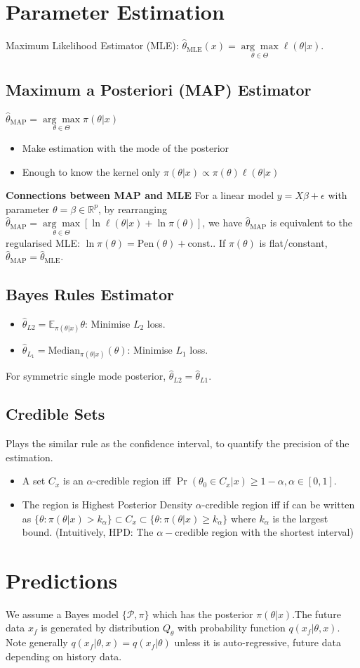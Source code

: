 \documentclass[5pt,a4paper, twocolumn]{article}
\newcommand{\topic}[1]{\section*{#1}}
\newcommand{\subtopic}[1]{\subsection*{#1}}
\newcommand{\keypoint}[1]{\textbf{#1}}
\begin{document}
{\topic{Parameter Estimation}
Maximum Likelihood Estimator (MLE): $\hat{\theta}_{\text{MLE}}(x) = \underset{\theta\in \Theta}{\arg \max} \ell(\theta \vert x)$.

\subtopic{Maximum a Posteriori (MAP) Estimator}
$\hat{\theta}_{\text{MAP}} = \underset{\theta\in\Theta}{\arg\max}\pi(\theta \vert x)$
\begin{itemize}
    \item Make estimation with the mode of the posterior
    \item Enough to know the kernel only $\pi(\theta \vert x)\propto \pi(\theta)\ell(\theta \vert x)$
\end{itemize}

\keypoint{Connections between MAP and MLE}
For a linear model $y=X\beta + \epsilon$ with parameter $\theta=\beta\in\mathbb{R}^p$, by rearranging $\hat{\theta}_{\text{MAP}} = \underset{\theta\in\Theta}{\arg\max}\left[ \ln\ell(\theta \vert x)+ \ln\pi(\theta) \right]$, we have $\hat{\theta}_{\text{MAP}}$ is equivalent to the regularised MLE: $\ln \pi(\theta) = \text{Pen}(\theta) + \text{const.}$. If $\pi(\theta)$ is flat/constant, $\hat{\theta}_{\text{MAP}} = \hat{\theta}_{\text{MLE}}$.

\subtopic{Bayes Rules Estimator}
\begin{itemize}
    \item $\hat{\theta}_{L2} = \mathbb{E}_{\pi(\theta \vert x)}\theta$: Minimise $L_2$ loss.
    \item $\hat{\theta}_{L_1} = \text{Median}_{\pi(\theta \vert x)}(\theta)$: Minimise $L_1$ loss.
\end{itemize}
For symmetric single mode posterior, $\hat{\theta}_{L2}=\hat{\theta}_{L1}$.

\subtopic{Credible Sets}
Plays the similar rule as the confidence interval, to quantify the precision of the estimation.
\begin{itemize}
    \item A set $C_x$ is an $\alpha$-credible region iff $\Pr(\theta_0 \in C_x \vert x) \geq 1-\alpha, \alpha\in[0, 1]$.
    \item The region is Highest Posterior Density $\alpha$-credible region iff if can be written as $\{\theta \colon \pi(\theta \vert x) > k_\alpha\} \subset C_x \subset \{\theta \colon \pi(\theta \vert x) \geq k_\alpha\}$ where $k_\alpha$ is the largest bound.
(Intuitively, HPD: The $\alpha-$credible region with the shortest interval)
\end{itemize}

\topic{Predictions}
We assume a Bayes model $\{\mathcal{P}, \pi\}$ which has the posterior $\pi(\theta \vert x)$.The future data $x_f$ is generated by distribution $Q_\theta$ with probability function $q(x_f \vert \theta, x)$. Note generally $q(x_f \vert \theta, x)=q(x_f \vert \theta)$ unless it is auto-regressive, future data depending on history data.

}
\end{document}
